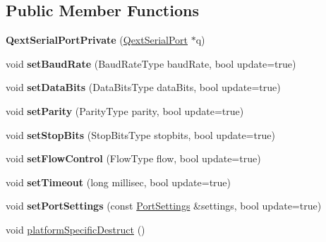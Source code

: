 \subsection*{Public Member Functions}
\begin{DoxyCompactItemize}
\item 
\mbox{\label{classQextSerialPortPrivate_ae40028def454b3b7ceda96590c843561}} 
{\bfseries Qext\+Serial\+Port\+Private} (\hyperlink{classQextSerialPort}{Qext\+Serial\+Port} $\ast$q)
\item 
\mbox{\label{classQextSerialPortPrivate_ab4cf4d3b42758d9805208ddce26215eb}} 
void {\bfseries set\+Baud\+Rate} (Baud\+Rate\+Type baud\+Rate, bool update=true)
\item 
\mbox{\label{classQextSerialPortPrivate_a33d235600c54568b1cde952e0293df44}} 
void {\bfseries set\+Data\+Bits} (Data\+Bits\+Type data\+Bits, bool update=true)
\item 
\mbox{\label{classQextSerialPortPrivate_ad1a380156394923938c41128ddde2a10}} 
void {\bfseries set\+Parity} (Parity\+Type parity, bool update=true)
\item 
\mbox{\label{classQextSerialPortPrivate_ab3ae113721dcd77de506ce47742ebd58}} 
void {\bfseries set\+Stop\+Bits} (Stop\+Bits\+Type stopbits, bool update=true)
\item 
\mbox{\label{classQextSerialPortPrivate_a2150c2071a220bfc57b97a3438d5c4ab}} 
void {\bfseries set\+Flow\+Control} (Flow\+Type flow, bool update=true)
\item 
\mbox{\label{classQextSerialPortPrivate_ab33a38a569ed9922101756be47069e21}} 
void {\bfseries set\+Timeout} (long millisec, bool update=true)
\item 
\mbox{\label{classQextSerialPortPrivate_aa95fcee325e1c3bb464be7f62a2cbf4d}} 
void {\bfseries set\+Port\+Settings} (const \hyperlink{structPortSettings}{Port\+Settings} \&settings, bool update=true)
\item 
void \hyperlink{classQextSerialPortPrivate_a43f36344c4f79f1851860118975495f6}{platform\+Specific\+Destruct} ()

\end{DoxyCompactItemize}
